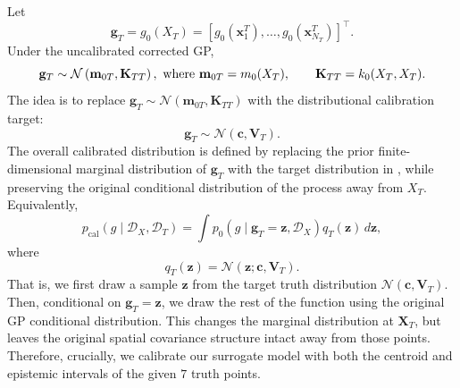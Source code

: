 \documentclass[journal]{new-aiaa}
\newcommand{\mbf}{\mathbf}
\newcommand{\mcl}{\mathcal}
\newcommand{\T}{\textnormal}
\newcommand{\x}{\mathbf{x}}
\begin{document}
Let
\begin{equation*}
    \mathbf{g}_T
    =
    g_0(X_T)
    =
    \left[
    g_0(\x_1^T),\ldots,g_0(\x_{N_T}^T)
    \right]^\top .
\end{equation*}
Under the uncalibrated corrected GP,
\begin{equation*}
    \mathbf{g}_T
    \sim
    \mathcal{N}
    \left(
    \mathbf{m}_{0T},
    \mathbf{K}_{TT}
    \right),~\T{where} ~ \mathbf{m}_{0T}
    =
    m_0(X_T),
    \qquad
    \mathbf{K}_{TT}
    =
    k_0(X_T,X_T).
\end{equation*}
The idea is to replace $\mathbf{g}_T \sim \mathcal{N}
    \left(
    \mathbf{m}_{0T},
    \mathbf{K}_{TT}
    \right)$ with the distributional
    calibration target:
\begin{equation}
    \mathbf{g}_T
    \sim
    \mathcal{N}
    \left(
    \mathbf{c},
    \mathbf{V}_T
    \right).
    \label{eqn:target_truth_marginal}
\end{equation}
The overall calibrated distribution is defined by replacing the prior finite-dimensional
marginal distribution of $\mathbf{g}_T$ with the target distribution in
, while preserving the original conditional
distribution of the process away from $X_T$.  Equivalently,
\begin{equation*}
    p_{\mathrm{cal}}
    \left(
    g \mid \mathcal{D}_X,\mathcal{D}_T
    \right)
    =
    \int
    p_0
    \left(
    g \mid \mathbf{g}_T=\mathbf{z},\mathcal{D}_X
    \right)
    q_T(\mathbf{z})
    \,
    d\mathbf{z},
\end{equation*}
where
\begin{equation*}
    q_T(\mathbf{z})
    =
    \mathcal{N}
    \left(
    \mathbf{z};
    \mathbf{c},
    \mathbf{V}_T
    \right).
\end{equation*}
That is, we first draw a sample $\mbf{z}$ from the target truth distribution $\mcl{N}(\mbf{c}, \mbf{V}_T)$. Then, conditional on $\mathbf{g}_T=\mbf{z}$, we draw the rest of the function using the original GP conditional distribution. This changes the marginal distribution at $\mbf{X}_T$, but leaves the original spatial covariance structure intact away from those points. Therefore, crucially, we calibrate our surrogate model with both the centroid and epistemic intervals of the given $7$ truth points.

\end{document}
